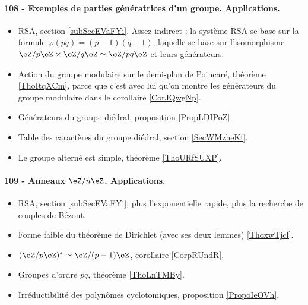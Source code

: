 \paragraph{108 - Exemples de parties génératrices d’un groupe. Applications.}
\begin{itemize}
    \item RSA, section \ref{subSecEVaFYi}. Assez indirect : la système RSA se base sur la formule \( \varphi(pq)=(p-1)(q-1)\), laquelle se base sur l'isomorphisme \( \eZ/p\eZ\times \eZ/q\eZ\simeq \eZ/pq\eZ\) et leurs générateurs.
    \item Action du groupe modulaire sur le demi-plan de Poincaré, théorème \ref{ThoItqXCm}, parce que c'est avec lui qu'on montre les générateurs du groupe modulaire dans le corollaire \ref{CorJQwgNp}.
    \item Générateurs du groupe diédral, proposition \ref{PropLDIPoZ}
    \item Table des caractères du groupe diédral, section \ref{SecWMzheKf}.
    \item Le groupe alterné est simple, théorème \ref{ThoURfSUXP}.
\end{itemize}

\paragraph{109 - Anneaux $\eZ/n\eZ$. Applications.}
\begin{itemize}
    \item RSA, section \ref{subSecEVaFYi}, plus l'exponentielle rapide, plus la recherche de couples de Bézout.
    \item Forme faible du théorème de Dirichlet (avec ses deux lemmes) \ref{ThoxwTjcl}.
    \item \( (\eZ/p\eZ)^*\simeq \eZ/(p-1)\eZ\), corollaire \ref{CorpRUndR}.
    \item Groupes d'ordre \( pq\), théorème \ref{ThoLnTMBy}.
    \item Irréductibilité des polynômes cyclotomiques, proposition \ref{PropoIeOVh}.
\end{itemize}

